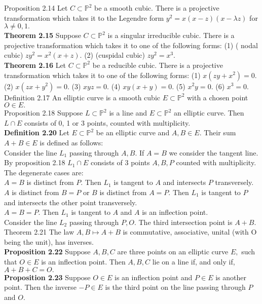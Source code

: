 \documentclass[8pt]{extarticle}
\begin{document}
Proposition 2.14 Let $C \subset \mathbb{P}^2$ be a smooth cubic. There is a projective transformation which takes it to the Legendre form $y^2=x(x-z)(x-\lambda z)$ for $\lambda \ne 0,1.$\\
\textbf{Theorem 2.15} Suppose $C \subset \mathbb{P}^2$ is a singular irreducible cubic. There is a projective transformation which takes it to one of the following forms: (1) ( nodal cubic) $zy^2=x^2(x+z).$ (2) (cuspidal cubic) $zy^2 = x^3.$\\
\textbf{Theorem 2.16} Let $C \subset \mathbb{P}^2$ be a reducible cubic. There is a projective transformation which takes it to one of the following forms: (1) $x(zy+x^2)=0.$ (2) $x(zx+y^2)=0.$ (3) $xyz = 0.$ (4) $xy(x+y)=0.$ (5) $x^2y=0.$ (6) $x^3=0.$\\
Definition 2.17 An elliptic curve is a smooth cubic $E \subset \mathbb{P}^2$ with a chosen point $O \in E.$\\
Proposition 2.18 Suppose $L \subset \mathbb{P}^2$ is a line and $E \subset \mathbb{P}^2$ an elliptic curve. Then $L \cap E$ consists of 0, 1 or 3 points, counted with multiplicity.\\
\textbf{Definition 2.20} Let $E \subset \mathbb{P}^2$ be an elliptic curve and $A,B \in E.$ Their sum $A+B \in E$ is defined as
follows:\\
Consider the line $L_1$ passing through $A, B.$ If $A = B$ we consider the tangent line.\\
By proposition 2.18 $L_1 \cap E$ consists of 3 points $A, B, P$ counted with multiplicity. The degenerate
cases are:\\
$A=B$ is distinct from $P.$ Then $L_1$ is tangent to $A$ and intersects $P$ transversely.\\
$A$ is distinct from $B=P$ or $B$ is distinct from $A=P.$ Then $L_1$ is tangent to $P$ and intersects the other point transversely.\\
$A=B=P$. Then $L_1$ is tangent to $A$ and $A$ is an inflection point.\\
Consider the line $L_2$ passing through $P,O.$ The third intersection point is $A+B.$\\
Theorem 2.21 The law $A, B \mapsto A + B$ is commutative, associative, unital (with O being the unit), has inverses.\\
\textbf{Proposition 2.22} Suppose $A, B, C$ are three points on an elliptic curve $E,$ such that $O \in E$ is an inflection point. Then $A,B,C$ lie on a line if, and only if, $A+B+C =O.$\\
\textbf{Proposition 2.23} Suppose $O \in E$ is an inflection point and $P \in E$ is another point. Then the inverse $-P \in E$ is the third point on the line passing through $P$ and $O.$\\
\end{document}
